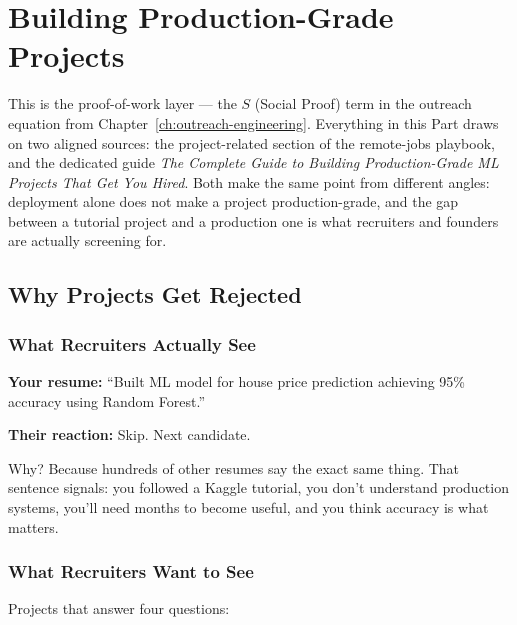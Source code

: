 \chapter{Building Production-Grade Projects}
\label{ch:projects}

This is the proof-of-work layer --- the $S$ (Social Proof) term in the outreach equation from
Chapter~\ref{ch:outreach-engineering}. Everything in this Part draws on two aligned sources: the project-related
section of the remote-jobs playbook, and the dedicated guide \emph{The Complete Guide to Building Production-Grade
ML Projects That Get You Hired}. Both make the same point from different angles: deployment alone does not make a
project production-grade, and the gap between a tutorial project and a production one is what recruiters and
founders are actually screening for.

\section{Why Projects Get Rejected}

\subsection{What Recruiters Actually See}

\begin{example}
\textbf{Your resume:} ``Built ML model for house price prediction achieving 95\% accuracy using Random Forest.''

\textbf{Their reaction:} Skip. Next candidate.
\end{example}

Why? Because hundreds of other resumes say the exact same thing. That sentence signals: you followed a Kaggle
tutorial, you don't understand production systems, you'll need months to become useful, and you think accuracy is
what matters.

\subsection{What Recruiters Want to See}

Projects that answer four questions:

